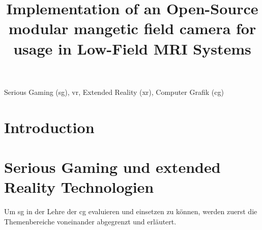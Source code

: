 \documentclass[conference]{IEEEtran}
\begin{document}
\title{Implementation of an Open-Source modular mangetic field camera for usage in Low-Field MRI Systems\\

}


\author{
}

\maketitle

\begin{abstract}

\end{abstract}

\begin{IEEEkeywords}
Serious Gaming (\gls{sg}), \gls{vr}, Extended Reality (\gls{xr}), Computer Grafik (\gls{cg})
\end{IEEEkeywords}

\section{Introduction}



\section{Serious Gaming und extended Reality Technologien}

Um \gls{sg} in der Lehre der \gls{cg} evaluieren und einsetzen zu können, werden zuerst die Themenbereiche voneinander abgegrenzt und erläutert.
\end{document}
